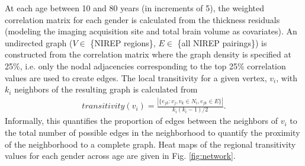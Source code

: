At each age between 10 and 80 years (in increments of 5), the weighted correlation
matrix for each gender is calculated from the thickness residuals 
(modeling the imaging acquisition site and total brain volume as covariates).  An undirected graph ($V \in$ \{NIREP regions\}, $E \in$ \{all NIREP pairings\})
is constructed from the correlation matrix where the graph density is specified at 25\%, i.e. only the nodal adjacencies corresponding to the top 25\% correlation values are used to create edges.    The local transitivity for a given vertex, $v_i$, with $k_i$ neighbors of the resulting graph is calculated from
\begin{align}
  transitivity(v_i) = \frac{|\{e_{jk}: v_j, v_k \in N_i, e_{jk} \in E \}|}{k_i (k_i-1)/2}.
\end{align}
Informally, this quantifies the proportion of edges between the neighbors of $v_i$ to the total number of possible edges in the neighborhood to quantify the proximity of the neighborhood to a complete graph.  Heat maps of the regional transitivity values for each
gender across age are given in Fig. \ref{fig:network}.  







